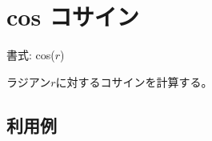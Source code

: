 
%

\section{cos コサイン\label{sect:cos}}

書式: cos($r$)

ラジアン$r$に対するコサインを計算する。

\subsection*{利用例}


%

